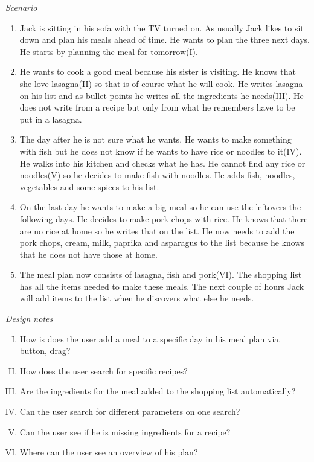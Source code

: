 \emph{Scenario}
\begin{enumerate}
\item Jack is sitting in his sofa with the TV turned on. As usually Jack likes to sit down and plan his meals ahead of time. He wants to plan the three next days. He starts by planning the meal for tomorrow(I).   
\item He wants to cook a good meal because his sister is visiting. He knows that she love lasagna(II) so that is of course what he will cook. He writes lasagna on his list and as bullet points he writes all the ingredients he needs(III). He does not write from a recipe but only from what he remembers have to be put in a lasagna.
\item The day after he is not sure what he wants. He wants to make something with fish but he does not know if he wants to have rice or noodles to it(IV). He walks into his kitchen and checks what he has. He cannot find any rice or noodles(V) so he decides to make fish with noodles. He adds fish, noodles, vegetables and some spices to his list.
\item On the last day he wants to make a big meal so he can use the leftovers the following days. He decides to make pork chops with rice. He knows that there are no rice at home so he writes that on the list. He now needs to add the pork chops, cream, milk, paprika and asparagus to the list because he knows that he does not have those at home. 
\item The meal plan now consists of lasagna, fish and pork(VI). The shopping list has all the items needed to make these meals. The next couple of hours Jack will add items to the list when he discovers what else he needs.   
\end{enumerate}

\emph{Design notes}
\begin{enumerate} [(I)]
\item How is does the user add a meal to a specific day in his meal plan via. button, drag?
\item How does the user search for specific recipes?
\item Are the ingredients for the meal added to the shopping list automatically?
\item Can the user search for different parameters on one search?
\item Can the user see if he is missing ingredients for a recipe?
\item Where can the user see an overview of his plan?
\end{enumerate}


